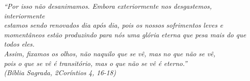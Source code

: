 \begin{epigrafe}
    \vspace*{\fill}
	\begin{flushright}

		\textit{``Por isso não desanimamos. Embora exteriormente nos desgastemos, interiormente\\
		estamos sendo renovados dia após dia, pois os nossos sofrimentos leves e momentâneos estão produzindo para nós uma glória eterna que pesa mais do que todos eles.\\
        Assim, fixamos os olhos, não naquilo que se vê, mas no que não se vê,\\
		pois o que se vê é transitório, mas o que não se vê é eterno.''\\
		(Bíblia Sagrada, 2Coríntios 4, 16-18)}
  
	\end{flushright}
\end{epigrafe}